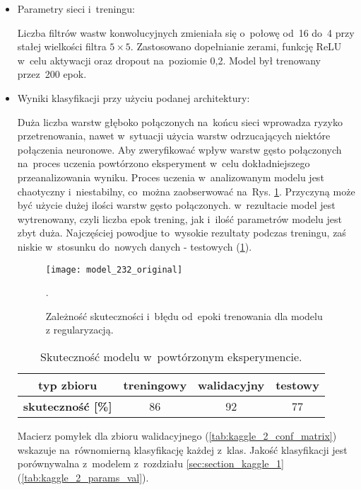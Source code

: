 {\begin{itemize}
\item Parametry sieci i~treningu:

Liczba filtrów wastw konwolucyjnych zmieniała się o~połowę od~16 do~4 przy stałej wielkości filtra $5\times5$. Zastosowano dopełnianie zerami, funkcję ReLU w~celu aktywacji oraz dropout na~poziomie 0,2. Model był trenowany przez~200 epok.

\item Wyniki klasyfikacji przy użyciu podanej architektury:

Duża liczba warstw głęboko połączonych na~końcu sieci wprowadza ryzyko przetrenowania, nawet w~sytuacji użycia warstw odrzucających niektóre połączenia neuronowe. Aby zweryfikować wpływ warstw gęsto połączonych na~proces uczenia powtórzono eksperyment w~celu dokładniejszego przeanalizowania wyniku. Proces uczenia w~analizowanym modelu jest chaotyczny i~niestabilny, co~można zaobserwować na~Rys. \ref{fig:kaggle_2_acc_trening}. Przyczyną może być użycie dużej ilości warstw gęsto połączonych. w~rezultacie model jest wytrenowany, czyli liczba epok trening, jak i~ilość parametrów modelu jest zbyt duża. Najczęściej powodjue to~wysokie rezultaty podczas treningu, zaś niskie w~stosunku do~nowych danych - testowych (\ref{tab:kaggle_2_acc_2}).

\begin{figure}[h!]
	\centering
	\centering
		\texttt{[image: model\_232\_original]}
	\caption{Zależność skuteczności i~błędu od~epoki trenowania dla modelu z regularyzacją.}.
	\label{fig:kaggle_2_acc_trening}
\end{figure}

\begin{table}[h!]
\centering
\caption[Short Heading]{Skuteczność modelu w~powtórzonym eksperymencie.}
\label{tab:kaggle_2_acc_2}
\begin{tabular}{|c|c|c|c|}
\hline
\textbf{typ zbioru}           & \textbf{treningowy} & \textbf{walidacyjny} & \textbf{testowy} \\ \hline
\textbf{skuteczność {[}\%{]}} & 86                  & 92                   & 77               \\ \hline
\end{tabular}
\end{table}

Macierz pomyłek dla zbioru walidacyjnego (\ref{tab:kaggle_2_conf_matrix}) wskazuje na~równomierną klasyfikację każdej z~klas. Jakość klasyfikacji jest porównywalna z~modelem z~rozdziału \ref{sec:section_kaggle_1} (\ref{tab:kaggle_2_params_val}).


\end{itemize}}
